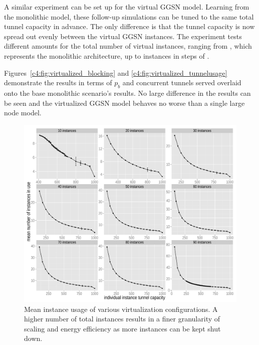 A similar experiment can be set up for the virtual \gls{GGSN} model. Learning from the monolithic model, these follow-up simulations can be tuned to the same total tunnel capacity in advance. The only difference is that the tunnel capacity is now spread out evenly between the virtual \gls{GGSN} instances. The experiment tests different amounts for the total number of virtual instances, ranging from , which represents the monolithic architecture, up to  instances in steps of .

Figures~\ref{c4:fig:virtualized_blocking} and \ref{c4:fig:virtualized_tunnelusage} demonstrate the results in terms of $p_b$ and concurrent tunnels served overlaid onto the base monolithic scenario's results. No large difference in the results can be seen and the virtualized \gls{GGSN} model behaves no worse than a single large node model.

\begin{figure}[htb]
	\centering
	\includegraphics[width=1.0\textwidth]{images/R-virtualized-mean-instanceusage.pdf}
	\caption{Mean instance usage of various virtualization configurations. A higher number of total instances results in a finer granularity of scaling and energy efficiency as more instances can be kept shut down.}
 \label{c4:fig:res-instance-usage-mean}
\end{figure}

